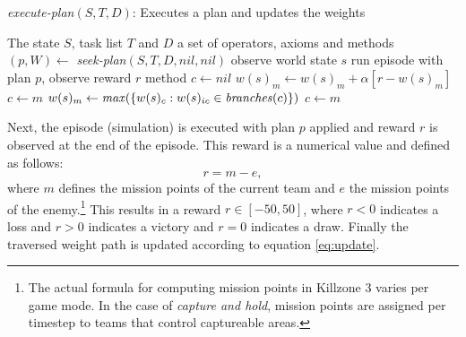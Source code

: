 \begin{algorithm}
	\caption{\emph{execute-plan}$(S,T,D)$: Executes a plan and updates the weights}
	\begin{algorithmic}[1]
	\REQUIRE The state $S$, task list $T$ and $D$ a set of operators, axioms and methods
	\medskip
	\STATE $(p,W) \leftarrow$ \emph{seek-plan}$(S,T,D,nil,nil)$
	\STATE observe world state $s$
	\STATE run episode with plan $p$, observe reward $r$
	\STATE method $c \leftarrow nil$
			\STATE $w(s)_m \leftarrow w(s)_m + \alpha [r - w(s)_m]$
			\STATE $c \leftarrow m$
		\ELSE
			\STATE $w(s)_m \leftarrow \textrm{\emph{max}}(\{w(s)_c : w(s)_{ic} \in \textrm{\emph{branches}}(c)\})$
			\STATE $c \leftarrow m$
		\ENDIF
	\ENDFOR
	\end{algorithmic}
\label{alg:executeplan}
\end{algorithm}
Next, the episode (simulation) is executed with plan $p$ applied and reward $r$
is observed at the end of the episode. This reward is a numerical value and
defined as follows:
\begin{equation}
r = m - e,
\label{eq:reward}
\end{equation}
where $m$ defines the mission points of the current team and $e$ the mission
points of the enemy.\footnote{The actual formula for computing mission points in
Killzone 3 varies per game mode. In the case of \emph{capture and hold}, mission
points are assigned per timestep to teams that control captureable areas.}
This results in a reward $r \in [-50,50]$, where $r < 0$ indicates a loss and
$r > 0$ indicates a victory and $r = 0$ indicates a draw.  Finally the
traversed weight path is updated according to equation \ref{eq:update}.

